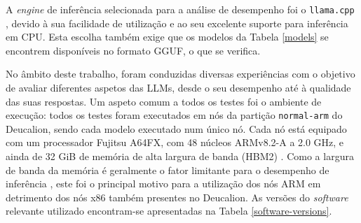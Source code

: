 \documentclass[11pt, a4paper]{article}
\begin{document}
A \emph{engine} de inferência selecionada para a análise de desempenho foi o \texttt{llama.cpp}
\cite{llama.cpp}, devido à sua facilidade de utilização e ao seu excelente suporte para inferência
em CPU. Esta escolha também exige que os modelos da Tabela \ref{models} se encontrem disponíveis no
formato GGUF, o que se verifica.

No âmbito deste trabalho, foram conduzidas diversas experiências com o objetivo de avaliar
diferentes aspetos das LLMs, desde o seu desempenho até à qualidade das suas respostas. Um aspeto
comum a todos os testes foi o ambiente de execução: todos os testes foram executados em nós da
partição \texttt{normal-arm} do Deucalion, sendo cada modelo executado num único nó. Cada nó está
equipado com um processador Fujitsu A64FX, com 48 núcleos ARMv8.2-A a 2.0 GHz, e ainda de 32 GiB de
memória de alta largura de banda (HBM2) \cite{deucalion, a64fx}. Como a largura de banda da memória
é geralmente o fator limitante para o desempenho de inferência \cite{memory-bound}, este foi o
principal motivo para a utilização dos nós ARM em detrimento dos nós x86 também presentes no
Deucalion. As versões do \emph{software} relevante utilizado encontram-se apresentadas na Tabela
\ref{software-versions}.
\end{document}
